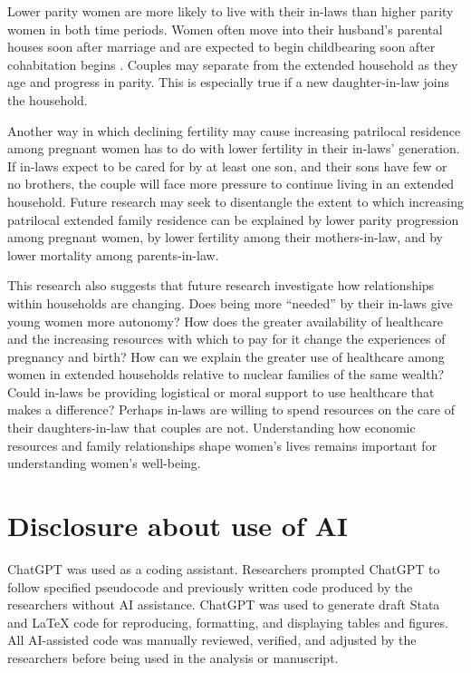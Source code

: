 \documentclass[10pt,twoside,reqno]{article}
\begin{document}
Lower parity women are more likely to live with their in-laws than higher parity women in both time periods.  Women often move into their husband's parental houses soon after marriage \citep{breton2021modernisation} and are expected to begin childbearing soon after cohabitation begins \citep{ibarra2020desire}. Couples may separate from the extended household as they age and progress in parity. This is especially true if a new daughter-in-law joins the household.  

Another way in which declining fertility may cause increasing patrilocal residence among pregnant women has to do with lower fertility in their in-laws' generation.  If in-laws expect to be cared for by at least one son, and their sons have few or no brothers, the couple will face more pressure to continue living in an extended household.  Future research may seek to disentangle the extent to which increasing patrilocal extended family residence can be explained by lower parity progression among pregnant women, by lower fertility among their mothers-in-law, and by lower mortality among parents-in-law. 

This research also suggests that future research investigate how relationships within households are changing. Does being more ``needed'' by their in-laws give young women more autonomy?  How does the greater availability of healthcare and the increasing resources with which to pay for it change the experiences of pregnancy and birth?  How can we explain the greater use of healthcare among women in extended households relative to nuclear families of the same wealth?  Could in-laws be providing logistical or moral support to use healthcare that makes a difference?  Perhaps in-laws are willing to spend resources on the care of their daughters-in-law that couples are not.  Understanding how economic resources and family relationships shape women's lives remains important for understanding women's well-being. 





\section*{Disclosure about use of AI}

ChatGPT was used as a coding assistant. Researchers prompted ChatGPT to follow specified pseudocode and previously written code produced by the researchers without AI assistance. ChatGPT was used to generate draft Stata and LaTeX code for reproducing, formatting, and displaying tables and figures. All AI-assisted code was manually reviewed, verified, and adjusted by the researchers before being used in the analysis or manuscript.
\end{document}
